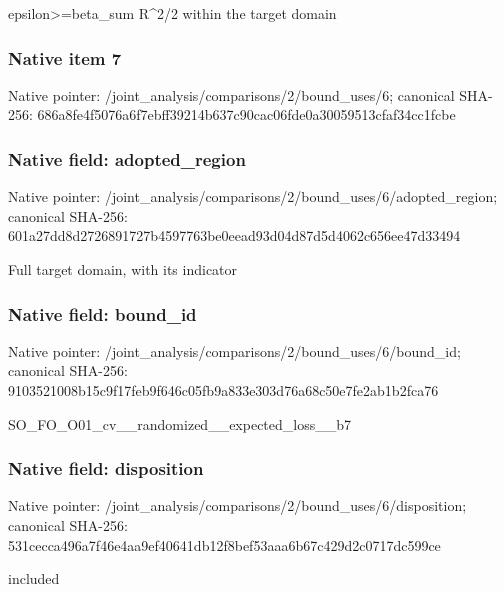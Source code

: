 \documentclass[10pt,a4paper]{article}
\begin{document}
\begingroup\raggedright\sloppy epsilon>=\allowbreak{}beta\_\allowbreak{}sum R\textasciicircum{}2/\allowbreak{}2 within the target domain\par\endgroup

\subsubsection{Native item 7}
Native pointer: /joint\_\allowbreak{}analysis/comparisons/2/bound\_\allowbreak{}uses/6; canonical SHA-256: 686a8fe4f5076a6f7ebff39214b637c90cac06fde0a30059513cfaf34cc1fcbe

\subsubsection{Native field: adopted\_\allowbreak{}region}
Native pointer: /joint\_\allowbreak{}analysis/comparisons/2/bound\_\allowbreak{}uses/6/adopted\_\allowbreak{}region; canonical SHA-256: 601a27dd8d2726891727b4597763be0eead93d04d87d5d4062c656ee47d33494

\begingroup\raggedright\sloppy Full target domain,\allowbreak{} with its indicator\par\endgroup

\subsubsection{Native field: bound\_\allowbreak{}id}
Native pointer: /joint\_\allowbreak{}analysis/comparisons/2/bound\_\allowbreak{}uses/6/bound\_\allowbreak{}id; canonical SHA-256: 9103521008b15c9f17feb9f646c05fb9a833e303d76a68c50e7fe2ab1b2fca76

\begingroup\raggedright\sloppy SO\_\allowbreak{}FO\_\allowbreak{}O01\_\allowbreak{}cv\_\allowbreak{}\_\allowbreak{}randomized\_\allowbreak{}\_\allowbreak{}expected\_\allowbreak{}loss\_\allowbreak{}\_\allowbreak{}b7\par\endgroup

\subsubsection{Native field: disposition}
Native pointer: /joint\_\allowbreak{}analysis/comparisons/2/bound\_\allowbreak{}uses/6/disposition; canonical SHA-256: 531cecca496a7f46e4aa9ef40641db12f8bef53aaa6b67c429d2c0717dc599ce

\begingroup\raggedright\sloppy included\par\endgroup
\end{document}
